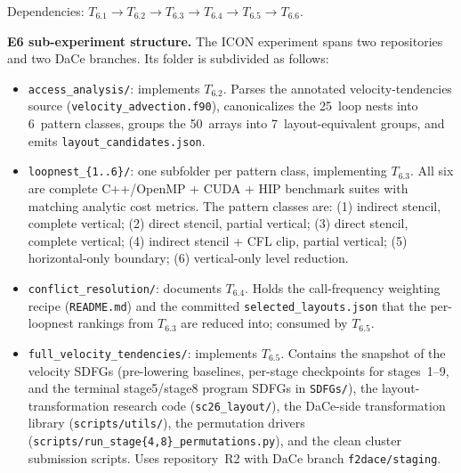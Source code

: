 \documentclass[conference]{IEEEtran}
\begin{document}
\noindent Dependencies: $T_{6.1} \to T_{6.2} \to T_{6.3} \to T_{6.4} \to T_{6.5} \to T_{6.6}$.

\textbf{E6 sub-experiment structure.}
The ICON experiment spans two repositories and two DaCe branches.
Its folder is subdivided as follows:

\begin{itemize}
\item \texttt{access\_analysis/}: implements $T_{6.2}$.
Parses the annotated velocity-tendencies source (\texttt{velocity\_advection.f90}), canonicalizes the 25~loop nests into 6~pattern classes, groups the 50~arrays into 7~layout-equivalent groups, and emits \texttt{layout\_candidates.json}.

\item \texttt{loopnest\_\{1..6\}/}: one subfolder per pattern class, implementing $T_{6.3}$.
All six are complete C++/OpenMP + CUDA + HIP benchmark suites with matching analytic cost metrics.
The pattern classes are: (1) indirect stencil, complete vertical; (2) direct stencil, partial vertical; (3) direct stencil, complete vertical; (4) indirect stencil + CFL clip, partial vertical; (5) horizontal-only boundary; (6) vertical-only level reduction.

\item \texttt{conflict\_resolution/}: documents $T_{6.4}$.
Holds the call-frequency weighting recipe (\texttt{README.md}) and the committed \texttt{selected\_layouts.json} that the per-loopnest rankings from $T_{6.3}$ are reduced into; consumed by $T_{6.5}$.

\item \texttt{full\_velocity\_tendencies/}: implements $T_{6.5}$.
Contains the snapshot of the velocity SDFGs (pre-lowering baselines, per-stage checkpoints for stages~1--9, and the terminal stage5/stage8 program SDFGs in \texttt{SDFGs/}), the layout-transformation research code (\texttt{sc26\_layout/}), the DaCe-side transformation library (\texttt{scripts/utils/}), the permutation drivers (\texttt{scripts/run\_stage\{4,8\}\_permutations.py}), and the clean cluster submission scripts.
Uses repository~R2 with DaCe branch \texttt{f2dace/staging}.
\end{itemize}
\end{document}
